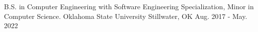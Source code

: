 

\begin{cventries}

  \cventry
    {B.S. in Computer Engineering with Software Engineering Specialization, Minor in Computer Science.} %
    {Oklahoma State University} %
    {Stillwater, OK} %
    {Aug. 2017 - May. 2022} %
    {
    }

\end{cventries}
\vspace*{-.7cm}%